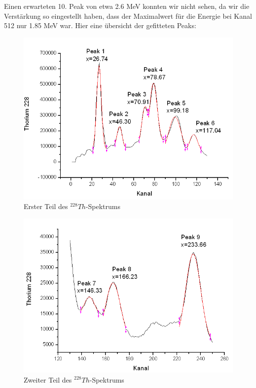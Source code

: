 Einen erwarteten 10. Peak von etwa 2.6 MeV konnten wir nicht sehen, da wir die Verstärkung so eingestellt haben, dass der Maximalwert für die Energie bei Kanal 512 nur 1.85 MeV war. Hier eine übersicht der gefitteten Peaks:

\begin{figure}[H]
\centering \includegraphics[width = \textwidth]{auswertung/Th1.png}
\caption{Erster Teil des $^{228}Th$-Spektrums}
\end{figure}

\begin{figure}[H]
\centering \includegraphics[width = \textwidth]{auswertung/Th2.png}
\caption{Zweiter Teil des $^{228}Th$-Spektrums}
\end{figure}

